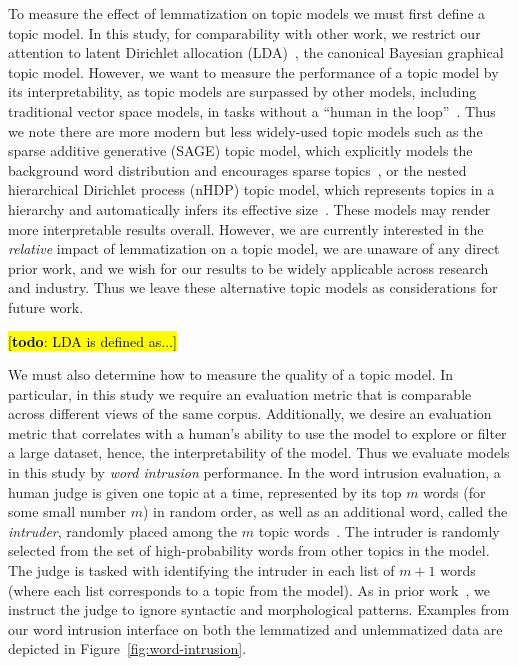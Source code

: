 \documentclass[11pt,letterpaper]{article}
\newcommand{\Note}[3]{\sethlcolor{#2}\hl{[\textbf{#1}: #3]}}
\newcommand{\todo}[1]{\Note{todo}{red}{#1}}
\begin{document}
{To measure the effect of lemmatization on topic models we must first
define a topic model.  In this study, for comparability with other
work, we restrict our attention to latent Dirichlet allocation
(LDA)~\cite{blei2003}, the canonical Bayesian graphical topic model.
However, we want to measure the performance of a topic model by its
interpretability, as topic models are surpassed by other models,
including traditional vector space models, in tasks without a ``human
in the loop''~\cite{may2015}.  Thus we note there are more modern but
less widely-used topic models such as the sparse additive generative
(SAGE) topic model, which explicitly models the background word
distribution and encourages sparse topics~\cite{eisenstein2009}, or the
nested hierarchical Dirichlet process (nHDP) topic model, which
represents topics in a hierarchy and automatically infers its effective
size~\cite{paisley2015}.  These models may render more interpretable
results overall.  However, we are currently interested in the
\emph{relative} impact of lemmatization on a topic model, we are
unaware of any direct prior work, and we wish for our results to be
widely applicable across research and industry.  Thus we leave these
alternative topic models as considerations for future work.

\todo{LDA is defined as...}

We must also determine how to measure the quality of a
topic model.  In particular, in this study we require an evaluation
metric that is comparable across different views of the same corpus.
Additionally, we desire an evaluation metric that correlates with a
human's ability to use the model to explore or filter a large dataset,
hence, the interpretability of the model.  Thus we evaluate models in
this study by \emph{word intrusion} performance.  In the word intrusion
evaluation, a human judge is given one topic at a time, represented
by its top $m$ words (for some small number $m$) in random order, as
well as an additional word, called the \emph{intruder}, randomly placed
among the $m$ topic words~\cite{chang2009}.
The intruder is randomly selected from the set of high-probability
words from other topics in the model.
The judge is tasked with identifying the intruder in each list of
$m + 1$ words (where each list corresponds to a topic from the model).
As in prior work~\cite{chang2009}, we instruct the judge to ignore
syntactic and morphological patterns.  Examples from our word
intrusion interface on both the lemmatized and unlemmatized data
are depicted in Figure~\ref{fig:word-intrusion}.

}
\end{document}
